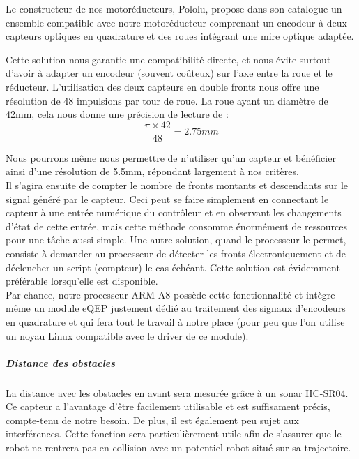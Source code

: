 				Le constructeur de nos motoréducteurs, Pololu, propose dans son catalogue un ensemble compatible avec notre motoréducteur comprenant un encodeur à deux capteurs optiques en quadrature et des roues intégrant une mire optique adaptée.


				Cette solution nous garantie une compatibilité directe, et nous évite surtout d'avoir à adapter un encodeur (souvent coûteux) sur l'axe entre la roue et le réducteur. L'utilisation des deux capteurs en double fronts nous offre une résolution de 48 impulsions par tour de roue. La roue ayant un diamètre de 42mm, cela nous donne une précision de lecture de :
				\[\frac{\pi \times 42}{48}=2.75mm\]

				Nous pourrons même nous permettre de n'utiliser qu'un capteur et bénéficier ainsi d'une résolution de 5.5mm, répondant largement à nos critères.\\

				Il s'agira ensuite de compter le nombre de fronts montants et descendants sur le signal généré par le capteur.
				Ceci peut se faire simplement en connectant le capteur à une entrée numérique du contrôleur et en observant les changements d'état de cette entrée, mais cette méthode consomme énormément de ressources pour une tâche aussi simple. Une autre solution, quand le processeur le permet, consiste à demander au processeur de détecter les fronts électroniquement et de déclencher un script (compteur) le cas échéant. Cette solution est évidemment préférable lorsqu'elle est disponible.\\

				Par chance, notre processeur ARM-A8 possède cette fonctionnalité et intègre même un module eQEP\cite{bib12} \label{eQEP} justement dédié au traitement des signaux d'encodeurs en quadrature et qui fera tout le travail à notre place (pour peu que l'on utilise un noyau Linux compatible avec le driver de ce module).

			\subparagraph*{Distance des obstacles}

				La distance avec les obstacles en avant sera mesurée grâce à un sonar HC-SR04. Ce capteur a l'avantage d'être facilement utilisable et est suffisament précis, compte-tenu de notre besoin. De plus, il est également peu sujet aux interférences.
				Cette fonction sera particulièrement utile afin de s'assurer que le robot ne rentrera pas en collision avec un potentiel robot situé sur sa trajectoire.\\
				
